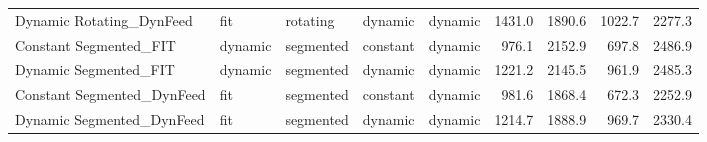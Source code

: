 \begin{tabular}{lllllrrrr}
Dynamic Rotating\_DynFeed     &      fit &     rotating &   dynamic &     dynamic &        1431.0 &        1890.6 &        1022.7 &            2277.3 \\
Constant Segmented\_FIT       &  dynamic &    segmented &  constant &     dynamic &         976.1 &        2152.9 &         697.8 &            2486.9 \\
Dynamic Segmented\_FIT        &  dynamic &    segmented &   dynamic &     dynamic &        1221.2 &        2145.5 &         961.9 &            2485.3 \\
Constant Segmented\_DynFeed   &      fit &    segmented &  constant &     dynamic &         981.6 &        1868.4 &         672.3 &            2252.9 \\
Dynamic Segmented\_DynFeed    &      fit &    segmented &   dynamic &     dynamic &        1214.7 &        1888.9 &         969.7 &            2330.4 \\
\bottomrule
\end{tabular}
